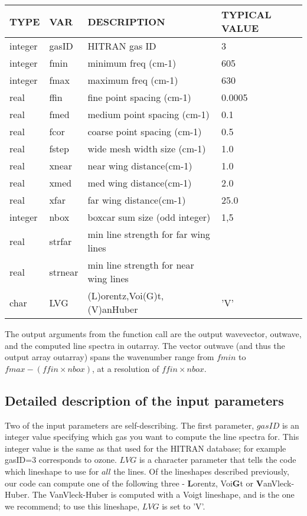 \documentclass[11pt]{article}
\begin{document}
\begin{longtable}{llll}
  TYPE  &   VAR  &         DESCRIPTION  &            TYPICAL VALUE\\
\hline
integer & gasID  &       HITRAN gas ID      &            3\\
\hline
integer & fmin    &      minimum freq (cm-1) &          605\\
integer & fmax    &      maximum freq (cm-1) &          630\\
\hline
real   &  ffin    &      fine point spacing (cm-1) &    0.0005\\
real   &  fmed    &      medium point spacing (cm-1)&   0.1\\
real   &  fcor    &      coarse point spacing (cm-1)  & 0.5\\
\hline
real   &  fstep   &      wide mesh width size (cm-1) &    1.0\\
real   &  xnear   &      near wing distance(cm-1)    &    1.0\\
real   &  xmed    &      med wing distance(cm-1)     &    2.0\\
real   &  xfar    &      far wing distance(cm-1)     &    25.0\\
\hline
integer & nbox     &     boxcar sum size (odd integer) &  1,5\\
\hline
real   &  strfar   &    min line strength for far wing lines & \\
real   &  strnear  &    min line strength for near wing lines& \\
\hline
char   &  LVG       &    (L)orentz,Voi(G)t,(V)anHuber  &  'V'\\
\hline
\end{longtable}

The output arguments from the function call are the output wavevector, 
outwave, and the computed line spectra in outarray. The vector outwave (and 
thus the output array outarray) spans the wavenumber range from $fmin$ to 
$fmax-(ffin \times  nbox)$, at a resolution of $ffin \times nbox$.

\subsection{Detailed description of the input parameters}

Two of the input parameters are self-describing. The first parameter, 
$gasID$ is an integer value specifying which gas you want to compute the 
line spectra for. This integer value is the same as that used for the 
HITRAN database; for example gasID=3 corresponds to ozone. $LVG$ is a
character parameter that tells the code which lineshape to use for $all$ 
the lines. Of the lineshapes described previously, our code can compute 
one of the following three - \textbf{L}orentz, Voi\textbf{G}t or 
\textbf{V}anVleck-Huber. The 
VanVleck-Huber is computed with a Voigt lineshape, and is the one we 
recommend; to use this lineshape, $LVG$ is set to 'V'.
\end{document}
